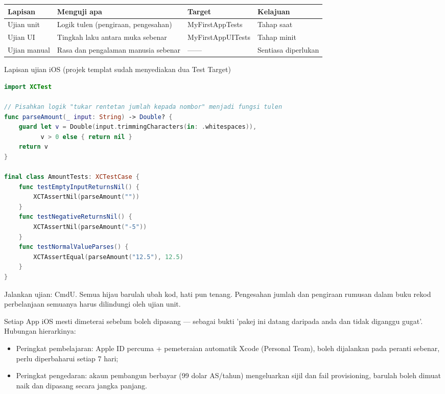 \begin{center}
\begin{tabularx}{\linewidth}{|X|X|X|X|}
\hline
\textbf{Lapisan} & \textbf{Menguji apa} & \textbf{Target} & \textbf{Kelajuan} \tabularnewline
\hline
Ujian unit & Logik tulen (pengiraan, pengesahan) & MyFirstAppTests & Tahap saat \tabularnewline
Ujian UI & Tingkah laku antara muka sebenar & MyFirstAppUITests & Tahap minit \tabularnewline
Ujian manual & Rasa dan pengalaman manusia sebenar & —— & Sentiasa diperlukan \tabularnewline
\hline
\end{tabularx}
\end{center}

\begin{center}\small\color{gray}Lapisan ujian iOS (projek templat sudah menyediakan dua Test Target)\end{center}

\begin{lstlisting}[language=Swift]
import XCTest

// Pisahkan logik "tukar rentetan jumlah kepada nombor" menjadi fungsi tulen
func parseAmount(_ input: String) -> Double? {
    guard let v = Double(input.trimmingCharacters(in: .whitespaces)),
          v > 0 else { return nil }
    return v
}

final class AmountTests: XCTestCase {
    func testEmptyInputReturnsNil() {
        XCTAssertNil(parseAmount(""))
    }
    func testNegativeReturnsNil() {
        XCTAssertNil(parseAmount("-5"))
    }
    func testNormalValueParses() {
        XCTAssertEqual(parseAmount("12.5"), 12.5)
    }
}
\end{lstlisting}

Jalankan ujian: CmdU. Semua hijau barulah ubah kod, hati pun tenang. Pengesahan jumlah dan pengiraan rumusan dalam buku rekod perbelanjaan semuanya harus dilindungi oleh ujian unit.


Setiap App iOS mesti dimeterai sebelum boleh dipasang — sebagai bukti 'pakej ini datang daripada anda dan tidak diganggu gugat'. Hubungan hierarkinya:

\begin{itemize}
  \item Peringkat pembelajaran: Apple ID percuma + pemeteraian automatik Xcode (Personal Team), boleh dijalankan pada peranti sebenar, perlu diperbaharui setiap 7 hari;
  \item Peringkat pengedaran: akaun pembangun berbayar (99 dolar AS/tahun) mengeluarkan sijil dan fail provisioning, barulah boleh dimuat naik dan dipasang secara jangka panjang.
\end{itemize}

